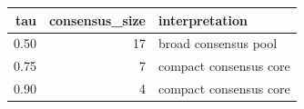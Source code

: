 \begin{tabular}{rrl}
\toprule
tau & consensus_size & interpretation \\
\midrule
0.50 & 17 & broad consensus pool \\
0.75 & 7 & compact consensus core \\
0.90 & 4 & compact consensus core \\
\bottomrule
\end{tabular}
